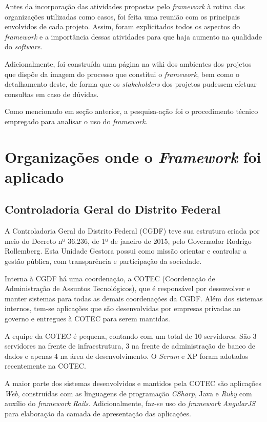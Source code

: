 Antes da incorporação das atividades propostas pelo \textit{framework} à rotina das organizações utilizadas como casos, foi feita uma reunião com os principais envolvidos de cada projeto. Assim, foram explicitados todos os aspectos do \textit{framework} e a importância dessas atividades para que haja aumento na qualidade do \textit{software}.

Adicionalmente, foi construída uma página na wiki dos ambientes dos projetos que dispõe da imagem do processo que constitui o \textit{framework}, bem como o detalhamento deste, de forma que os \textit{stakeholders} dos projetos pudessem efetuar consultas em caso de dúvidas.

Como mencionado em seção anterior, a pesquisa-ação foi o procedimento técnico empregado para analisar o uso do \textit{framework}.

\section{Organizações onde o \textit{Framework} foi aplicado}

\subsection{Controladoria Geral do Distrito Federal}

A Controladoria Geral do Distrito Federal (CGDF) teve sua estrutura criada por meio do Decreto nº 36.236, de 1º de janeiro de 2015, pelo Governador Rodrigo Rollemberg. Esta Unidade Gestora possui como missão orientar e controlar a gestão pública, com transparência e participação da sociedade.

Interna à CGDF há uma coordenação, a COTEC (Coordenação de Administração de Assuntos Tecnológicos), que é responsável por desenvolver e manter sistemas para todas as demais coordenações da CGDF. Além dos sistemas internos, tem-se aplicações que são desenvolvidas por empresas privadas ao governo e entregues à COTEC para serem mantidas.

A equipe da COTEC é pequena, contando com um total de 10 servidores. São 3 servidores na frente de infraestrutura, 3 na frente de administração de banco de dados e apenas 4 na área de desenvolvimento. O \textit{Scrum} e XP foram adotados recentemente na COTEC.

A maior parte dos sistemas desenvolvidos e mantidos pela COTEC são aplicações \textit{Web}, construídas com as linguagens de programação \textit{CSharp}, Java e \textit{Ruby} com auxílio do \textit{framework} \textit{Rails}. Adicionalmente, faz-se uso do \textit{framework} \textit{AngularJS} para elaboração da camada de apresentação das aplicações.

